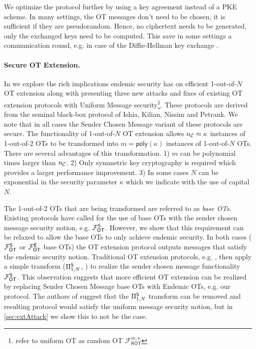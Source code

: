 We optimize the protocol further by using a key agreement instead of a PKE scheme. In many settings, the OT messages don't need to be chosen, it is sufficient if they are pseudorandom. Hence, no ciphertext needs to be generated, only the exchanged keys need to be computed. This save in some settings a communication round, e.g. in case of the Diffie-Hellman key exchange \cite{DifHel76}.

\paragraph{Secure OT Extension.} 
In  we explore the rich implications endemic security has on efficient 1-out-of-$N$ OT extension along with presenting three new attacks and fixes of existing OT extension protocols\cite{C:KelOrsSch15,RSA:OrrOrsSch17} with Uniform Message security\footnote{\cite{C:KelOrsSch15,RSA:OrrOrsSch17} refer to uniform OT as random OT $\mathcal{F}^{m,\kappa}_{\textsf{ROT}}$}. 
\iffullversion
These protocols are derived from the seminal black-box protocol of Ishia, Kilian, Nissim and Petrank\cite{C:IKNP03}. We note that in all cases the Sender Chosen Message variant of these protocols\cite{C:IKNP03,C:KelOrsSch15,RSA:OrrOrsSch17} are secure. 
\fi
The functionality of 1-out-of-$N$ OT extension allows ${n_\mathcal{C}}\approx\kappa$ instances of 1-out-of-2 OTs to be transformed into $m=\textsf{poly}(\kappa)$ instances of 1-out-of-$N$ OTs. There are several advantages of this transformation. 1) $m$ can be polynomial times larger than ${n_\mathcal{C}}$. 2) Only symmetric key cryptography is required which provides a larger performance improvement. 3) In some cases $N$ can be exponential in the security parameter $\kappa$ which we indicate with the use of capital $N$. 

The 1-out-of-2 OTs that are being transformed are referred to as \emph{base OTs}. Existing protocols \cite{C:IKNP03,EC:ALSZ15,C:KelOrsSch15,RSA:OrrOrsSch17} have called for the use of base OTs with the sender chosen message security notion, e.g. $\mathcal{F}_{\mathsf{OT}}^\mathsf{S}$. However, we show that this requirement can be relaxed to allow the base OTs to only achieve endemic security. In both cases ($\mathcal{F}_{\mathsf{OT}}^\mathsf{S}$ or $\mathcal{F}_{\mathsf{OT}}^\mathsf{E}$ base OTs) the OT extension protocol outputs messages that satisfy the endemic security notion.  Traditional OT extension protocols, e.g. \cite{C:IKNP03,EC:ALSZ15,C:KelOrsSch15}, then apply a simple transform ($\Pi^{\mathsf{S}}_{1,N}$, ) to realize the sender chosen message functionality $\mathcal{F}_{\mathsf{OT}}^\mathsf{S}$.
\iffullversion
 This observation suggests that more efficient OT extension can be realized by replacing Sender Chosen Message base OTs with Endemic OTs, e.g. our protocol.
\fi
The authors of \cite{C:KelOrsSch15,RSA:OrrOrsSch17} suggest that the $\Pi^{\mathsf{S}}_{1,N}$ transform  can be removed and resulting protocol would satisfy the uniform message security notion, but in  \ref{sec:extAttack} we show this to not be the case. 

